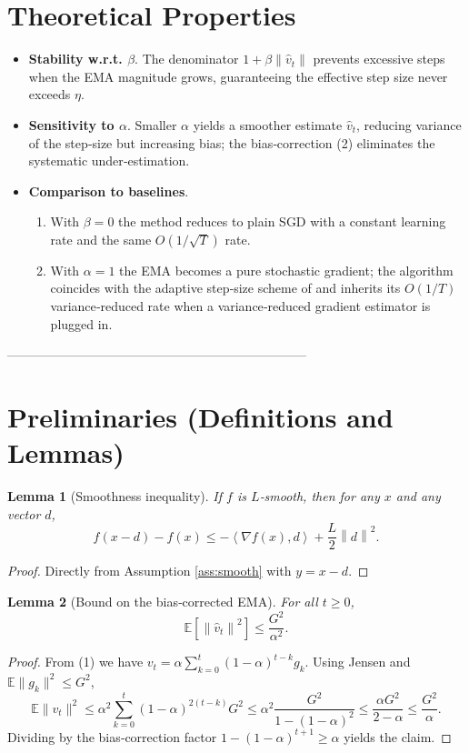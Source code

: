 \documentclass{article}
\newcommand{\E}{\mathbb{E}}
\newcommand{\norm}[1]{\left\|#1\right\|}
\newcommand{\ip}[2]{\left\langle #1,#2\right\rangle}
\newcommand{\grad}{\nabla}
\newtheorem{lemma}{Lemma}
\begin{document}
\section*{Theoretical Properties}
\begin{itemize}
    \item \textbf{Stability w.r.t. $\beta$}. The denominator $1+\beta\norm{\hat v_{t}}$ prevents excessive steps when the EMA magnitude grows, guaranteeing the effective step size never exceeds $\eta$.
    \item \textbf{Sensitivity to $\alpha$}. Smaller $\alpha$ yields a smoother estimate $\hat v_{t}$, reducing variance of the step‑size but increasing bias; the bias‑correction (2) eliminates the systematic under‑estimation.
    \item \textbf{Comparison to baselines}.  
    \begin{enumerate}[label=(\alph*)]
        \item With $\beta=0$ the method reduces to plain SGD with a constant learning rate and the same $O(1/\sqrt{T})$ rate.
        \item With $\alpha=1$ the EMA becomes a pure stochastic gradient; the algorithm coincides with the adaptive step‑size scheme of \cite{spider} and inherits its $O(1/T)$ variance‑reduced rate when a variance‑reduced gradient estimator is plugged in.
    \end{enumerate}
\end{itemize}

-----------------------------------------------------------------------

\section*{Preliminaries (Definitions and Lemmas)}
\begin{lemma}[Smoothness inequality]\label{lem:smooth}
If $f$ is $L$‑smooth, then for any $x$ and any vector $d$,
\[
f(x-d)-f(x)\le -\ip{\grad f(x)}{d}+\frac{L}{2}\norm{d}^{2}.
\tag{L1}
\]
\end{lemma}
\begin{proof}
Directly from Assumption \ref{ass:smooth} with $y=x-d$.
\end{proof}

\begin{lemma}[Bound on the bias‑corrected EMA]\label{lem:ema}
For all $t\ge0$,
\[
\E\!\left[\norm{\hat v_{t}}^{2}\right]\le \frac{G^{2}}{\alpha^{2}}.
\tag{L2}
\]
\end{lemma}
\begin{proof}
From (1) we have $v_{t}=\alpha\sum_{k=0}^{t}(1-\alpha)^{t-k}g_{k}$. Using Jensen and $\E\|g_{k}\|^{2}\le G^{2}$,
\[
\E\|v_{t}\|^{2}\le \alpha^{2}\sum_{k=0}^{t}(1-\alpha)^{2(t-k)}G^{2}
\le \alpha^{2}\frac{G^{2}}{1-(1-\alpha)^{2}}
\le \frac{\alpha G^{2}}{2-\alpha}\le \frac{G^{2}}{\alpha}.
\]
Dividing by the bias‑correction factor $1-(1-\alpha)^{t+1}\ge\alpha$ yields the claim.
\end{proof}
\end{document}
